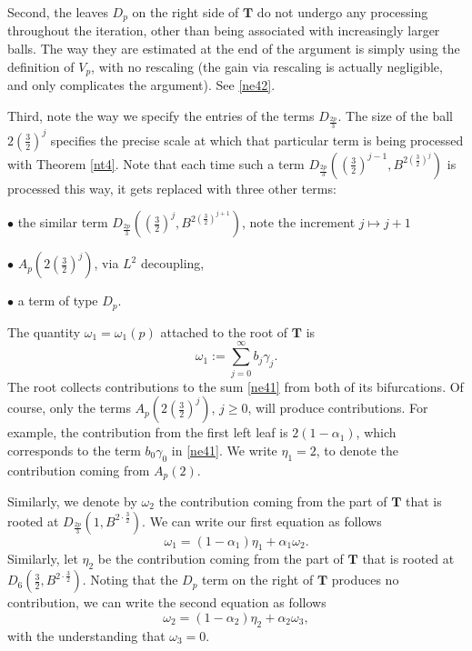 \documentclass[amssymb,amsfonts,12pt]{amsart}
\begin{document}
Second, the leaves $D_p$ on the right side of $\textbf{T}$ do not undergo any processing throughout the iteration, other than being associated with increasingly larger balls. The way they are estimated at the end of the argument is simply using the definition of $V_p$, with no  rescaling (the gain via  rescaling is actually negligible, and only complicates the argument). See \eqref{ne42}.

Third, note the way we specify the entries of the terms $D_{\frac{2p}{3}}$. The size of the ball $2(\frac32)^j$ specifies the precise scale at which that particular term is being processed with Theorem \ref{nt4}. Note that each time such a term $D_{\frac{2p}{3}}((\frac32)^{j-1},B^{2(\frac32)^j})$ is processed this way, it gets replaced with three other terms:

$\bullet$ the similar term $D_{\frac{2p}{3}}((\frac32)^{j},B^{2(\frac32)^{j+1}})$, note the increment $j\mapsto j+1$

$\bullet$ $A_p(2(\frac32)^j)$, via $L^2$ decoupling,

$\bullet$ a term of type $D_p$.
\bigskip

The quantity $\omega_1=\omega_1(p)$ attached to the root of $\textbf{T}$ is
$$\omega_1:=\sum_{j=0}^\infty b_j\gamma_j.$$
The root collects contributions to the sum \eqref{ne41} from both of its  bifurcations. Of course, only the terms $A_p(2(\frac32)^j)$, $j\ge 0$, will produce contributions.
For example, the contribution from the first left leaf is $2(1-\alpha_1)$, which corresponds to the term $b_0\gamma_0$ in \eqref{ne41}. We write $\eta_1=2$, to denote the contribution coming from  $A_p(2)$.

Similarly, we denote by $\omega_2$ the contribution coming from the part of $\textbf{T}$ that is rooted at $D_{\frac{2p}{3}}(1,B^{2\cdot\frac32})$. We can write our first equation as follows
\begin{equation}\label{ne44}
\omega_1=(1-\alpha_1)\eta_1+\alpha_1\omega_2.
\end{equation}
Similarly, let $\eta_2$ be the contribution coming from the part of $\textbf{T}$ that is rooted at $D_{6}(\frac32,B^{2\cdot\frac32})$. Noting that the $D_p$ term on the right of $\textbf{T}$ produces no contribution, we can write the second equation as follows
\begin{equation}\label{ne45}
\omega_2=(1-\alpha_2)\eta_2+\alpha_2\omega_3,
\end{equation}
with the understanding that $\omega_3=0$.
\end{document}
